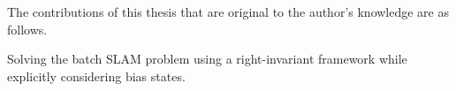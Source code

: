 
The contributions of this thesis that are original to the author's knowledge are as follows. 
\begin{packed_itemize}
  \item {}
	\begin{packed_itemize}
	  \item Solving the batch SLAM problem using a right-invariant framework while explicitly considering bias states.
  \end{packed_itemize}
\end{packed_itemize}